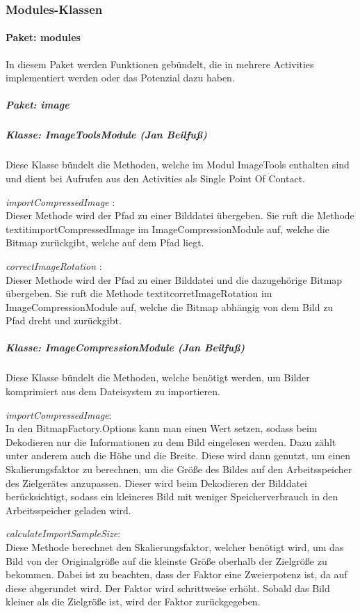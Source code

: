 \subsubsection{Modules-Klassen}
\paragraph{Paket: modules}
In diesem Paket werden Funktionen gebündelt, die in mehrere Activities implementiert werden oder das Potenzial dazu haben. 
\subparagraph{Paket: image}

\subparagraph*{Klasse: ImageToolsModule (Jan Beilfuß)}
Diese Klasse bündelt die Methoden, welche im Modul ImageTools enthalten sind und dient bei Aufrufen aus den Activities als Single Point Of Contact.

\textit{ importCompressedImage }:\\
Dieser Methode wird der Pfad zu einer Bilddatei übergeben. Sie ruft die Methode textit{importCompressedImage} im ImageCompressionModule auf, welche die Bitmap zurückgibt, welche auf dem Pfad liegt.

\textit{ correctImageRotation }:\\
Dieser Methode wird der Pfad zu einer Bilddatei und die dazugehörige Bitmap übergeben. Sie ruft die Methode textit{corretImageRotation} im ImageCompressionModule auf, welche die Bitmap abhängig von dem Bild zu Pfad dreht und zurückgibt.

\subparagraph*{Klasse: ImageCompressionModule (Jan Beilfuß)}
Diese Klasse bündelt die Methoden, welche benötigt werden, um Bilder komprimiert aus dem Dateisystem zu importieren.

\textit{importCompressedImage}:\\
In den BitmapFactory.Options kann man einen Wert setzen, sodass beim Dekodieren nur die Informationen zu dem Bild eingelesen werden. Dazu zählt unter anderem auch die Höhe und die Breite. Diese wird dann genutzt, um einen Skalierungsfaktor zu berechnen, um die Größe des Bildes auf den Arbeitsspeicher des Zielgerätes anzupassen. Dieser wird beim Dekodieren der Bilddatei berücksichtigt, sodass ein kleineres Bild mit weniger Speicherverbrauch in den Arbeitsspeicher geladen wird.

\textit{calculateImportSampleSize}:\\
Diese Methode berechnet den Skalierungsfaktor, welcher benötigt wird, um das Bild von der Originalgröße auf die kleinste Größe oberhalb der Zielgröße zu bekommen. Dabei ist zu beachten, dass der Faktor eine Zweierpotenz ist, da auf diese abgerundet wird. Der Faktor wird schrittweise erhöht. Sobald das Bild kleiner als die Zielgröße ist, wird der Faktor zurückgegeben.

